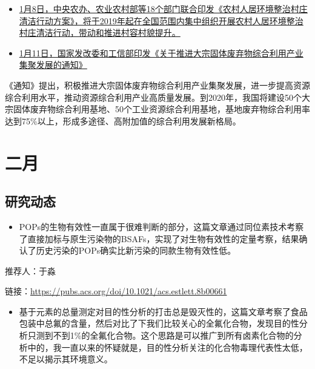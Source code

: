 \documentclass[]{book}
\providecommand{\tightlist}{%
  \setlength{\itemsep}{0pt}\setlength{\parskip}{0pt}}
\begin{document}
\begin{itemize}
\item
  \href{http://www.jxwst.gov.cn/doc/2019/01/08/122304.shtml}{1月8日，中央农办、农业农村部等18个部门联合印发《农村人居环境整治村庄清洁行动方案》，将于2019年起在全国范围内集中组织开展农村人居环境整治村庄清洁行动，带动和推进村容村貌提升。}
\item
  \href{http://www.miit.gov.cn/n1146285/n1146352/n3054355/n3057542/n3057545/c6589680/content.html}{1月11日，国家发改委和工信部印发《关于推进大宗固体废弃物综合利用产业集聚发展的通知》}
\end{itemize}

《通知》提出，积极推进大宗固体废弃物综合利用产业集聚发展，进一步提高资源综合利用水平，推动资源综合利用产业高质量发展。到2020年，我国将建设50个大宗固体废弃物综合利用基地、50个工业资源综合利用基地，基地废弃物综合利用率达到75\%以上，形成多途径、高附加值的综合利用发展新格局。

\hypertarget{ux4e8cux6708-1}{%
\section*{二月}\label{ux4e8cux6708-1}}

\hypertarget{ux7814ux7a76ux52a8ux6001-15}{%
\subsection*{研究动态}\label{ux7814ux7a76ux52a8ux6001-15}}

\begin{itemize}
\tightlist
\item
  POPs的生物有效性一直属于很难判断的部分，这篇文章通过同位素技术考察了直接加标与原生污染物的BSAFs，实现了对生物有效性的定量考察，结果确认了历史污染的POPs确实比新污染的同款生物有效性低。
\end{itemize}

推荐人：于淼

链接：\url{https://pubs.acs.org/doi/10.1021/acs.estlett.8b00661}

\begin{itemize}
\tightlist
\item
  基于元素的总量测定对目的性分析的打击总是毁灭性的，这篇文章考察了食品包装中总氟的含量，然后对比了下我们比较关心的全氟化合物，发现目的性分析只测到不到1\%的全氟化合物。这个思路是可以推广到所有卤素化合物的分析中的，我一直以来的怀疑就是，目的性分析关注的化合物毒理代表性太低，不足以揭示其环境意义。
\end{itemize}
\end{document}
